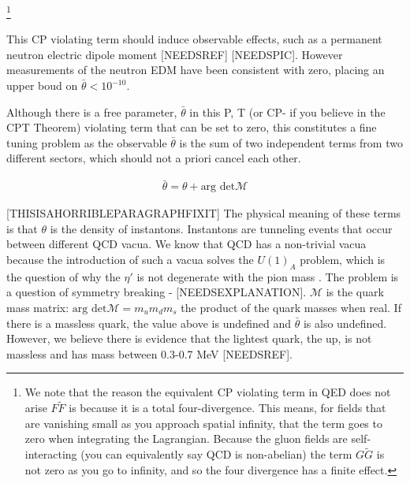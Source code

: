 \documentclass[12pt,twosides]{book}
\begin{document}
\footnote{We note that the reason the equivalent CP violating term in QED does not arise $F\tilde F$ is because it is a total four-divergence. This means, for fields that are vanishing small as you approach spatial infinity, that the term goes to zero when integrating the Lagrangian. Because the gluon fields are self-interacting (you can equivalently say QCD is non-abelian) the term $G \tilde G$ is not zero as you go to infinity, and so the four divergence has a finite effect.}

This CP violating term should induce observable effects, such as a permanent neutron electric dipole moment [NEEDSREF] [NEEDSPIC]. However measurements of the neutron EDM have been consistent with zero, placing an upper boud on $\bar \theta < 10^{-10}$.

Although there is a free parameter, $\bar \theta$ in this P, T (or CP- if you believe in the CPT Theorem) violating term that can be set to zero, this constitutes a fine tuning problem as the observable $\bar \theta$ is the sum of two independent terms from two different sectors, which should not a priori cancel each other.

\begin{align*}
\bar \theta = \theta + \text{arg det} \mathcal{M}
\end{align*}

[THISISAHORRIBLEPARAGRAPHFIXIT]
The physical meaning of these terms is that $\theta$ is the density of instantons. Instantons are tunneling events that occur between different QCD vacua. We know that QCD has a non-trivial vacua because the introduction of such a vacua solves the $U(1)_A$ problem, which is the question of why the $\eta'$ is not degenerate with the pion mass \cite{thooft76}. The problem is a question of symmetry breaking - [NEEDSEXPLANATION]. $\mathcal{M}$ is the quark mass matrix: $\text{arg det} \mathcal{M} = m_um_dm_s$ the product of the quark masses when real. If there is a massless quark, the value above is undefined and $\bar \theta$ is also undefined. However, we believe there is evidence that the lightest quark, the up, is not massless and has mass between 0.3-0.7 MeV [NEEDSREF].
\end{document}

